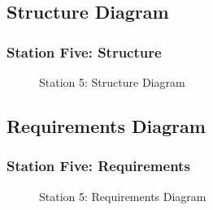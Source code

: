\documentclass{beamer}
\begin{document}
\subsection{Structure Diagram}
\begin{frame}[fragile]
\frametitle{Station Five: Structure}
\begin{figure}
	\centering
	\caption{Station 5: Structure Diagram}
	\label{dia:structure}
\end{figure}
\end{frame}

\subsection{Requirements Diagram}
\begin{frame}[fragile]
\frametitle{Station Five: Requirements}
\begin{figure}
	\centering
	\caption{Station 5: Requirements Diagram}
	\label{dia:requirements}
\end{figure}
\end{frame}
\end{document}

